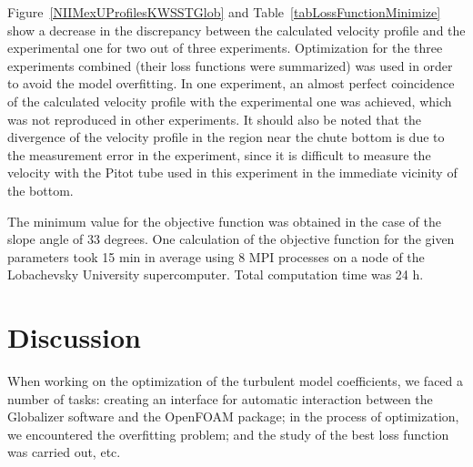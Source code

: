 \documentclass[mathematics,article,accept,pdftex,moreauthors]{Definitions/mdpi}
\begin{document}
Figure~\ref{NIIMexUProfilesKWSSTGlob} and Table~\ref{tabLossFunctionMinimize} show a decrease in the discrepancy between the calculated velocity profile and the experimental one for two out of three experiments. Optimization for the three experiments combined (their loss functions were summarized) was used in order to avoid the model overfitting. In one experiment, an almost perfect coincidence of the calculated velocity profile with the experimental one was achieved, which was not reproduced in other experiments. It should also be noted that the divergence of the velocity profile in the region near the chute bottom is due to the measurement error in the experiment, since it is difficult to measure the velocity with the Pitot tube used in this experiment in the immediate vicinity of the bottom.

The minimum value for the objective function was obtained in the case of the slope angle of 33 degrees. One calculation of the objective function for the given parameters took 15 min in average using 8 MPI processes on a node of the Lobachevsky University supercomputer. Total computation time was 24 h.

\section{Discussion}\label{sec6}

When working on the optimization of the turbulent model coefficients, we faced a number of tasks: creating an interface for automatic interaction between the Globalizer software and the OpenFOAM package; in the process of optimization, we encountered the overfitting problem; and the study of the best loss function was carried out, etc.
\end{document}
